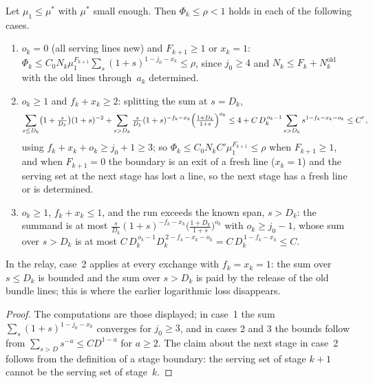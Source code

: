 \documentclass[11pt,letterpaper]{article}
\begin{document}
\begin{lemma}
\label{lem:balance}
Let $\mu_1\le\mu^*$ with $\mu^*$ small enough. Then $\Phi_k\le\rho<1$ holds in each of the following cases.
\begin{enumerate}
  \item $o_k=0$ (all serving lines new) and $F_{k+1}\ge1$ or $x_k=1$: $\Phi_k\le C_0N_k\mu_1^{F_{k+1}}\sum_s(1+s)^{1-j_0-x_k}\le\rho$, since $j_0\ge4$ and $N_k\le F_k+N^{\mathrm{old}}_k$ with the old lines through~$a_k$ determined.
  \item $o_k\ge1$ and $f_k+x_k\ge2$: splitting the sum at $s=D_k$,
  \begin{equation*}
    \sum_{s\le D_k}\bigl(1+\tfrac{s}{D_k}\bigr)(1+s)^{-2}+\sum_{s>D_k}\tfrac{s}{D_k}(1+s)^{-f_k-x_k}\Bigl(\tfrac{1+D_k}{1+s}\Bigr)^{o_k}\le4+C\,D_k^{\,o_k-1}\sum_{s>D_k}s^{1-f_k-x_k-o_k}\le C'\,,
  \end{equation*}
  using $f_k+x_k+o_k\ge j_0+1\ge3$; so $\Phi_k\le C_0N_kC'\mu_1^{F_{k+1}}\le\rho$ when $F_{k+1}\ge1$, and when $F_{k+1}=0$ the boundary is an exit of a fresh line ($x_k=1$) and the serving set at the next stage has lost a line, so the next stage has a fresh line or is determined.
  \item $o_k\ge1$, $f_k+x_k\le1$, and the run exceeds the known span, $s>D_k$: the summand is at most $\frac{s}{D_k}(1+s)^{-f_k-x_k}\bigl(\frac{1+D_k}{1+s}\bigr)^{o_k}$ with $o_k\ge j_0-1$, whose sum over $s>D_k$ is at most $C\,D_k^{\,o_k-1}D_k^{\,2-f_k-x_k-o_k}=C\,D_k^{\,1-f_k-x_k}\le C$.
\end{enumerate}
In the relay, case~2 applies at every exchange with $f_k=x_k=1$: the sum over $s\le D_k$ is bounded and the sum over $s>D_k$ is paid by the release of the old bundle lines; this is where the earlier logarithmic loss disappears.
\end{lemma}

\begin{proof}
The computations are those displayed; in case~1 the sum $\sum_s(1+s)^{1-j_0-x_k}$ converges for $j_0\ge3$, and in cases 2 and 3 the bounds follow from $\sum_{s>D}s^{-a}\le CD^{1-a}$ for $a\ge2$. The claim about the next stage in case~2 follows from the definition of a stage boundary: the serving set of stage $k+1$ cannot be the serving set of stage~$k$.
\end{proof}
\end{document}
